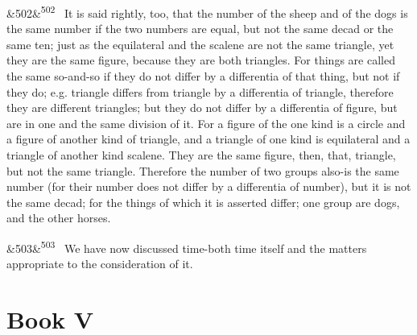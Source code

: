 \documentclass[12pt]{article}
\newcommand{\para}[1][]{\par\noindent\ifx&#1&\else\textsuperscript{\footnotesize #1}~\fi}
\begin{document}
\para[502] It is said rightly, too, that the number of the sheep and of the dogs is the same number if the two numbers are equal, but not the same decad or the same ten; just as the equilateral and the scalene are not the same triangle, yet they are the same figure, because they are both triangles. For things are called the same so-and-so if they do not differ by a differentia of that thing, but not if they do; e.g. triangle differs from triangle by a differentia of triangle, therefore they are different triangles; but they do not differ by a differentia of figure, but are in one and the same division of it. For a figure of the one kind is a circle and a figure of another kind of triangle, and a triangle of one kind is equilateral and a triangle of another kind scalene. They are the same figure, then, that, triangle, but not the same triangle. Therefore the number of two groups also-is the same number (for their number does not differ by a differentia of number), but it is not the same decad; for the things of which it is asserted differ; one group are dogs, and the other horses.

\para[503] We have now discussed time-both time itself and the matters appropriate to the consideration of it.

\section*{Book V}
\end{document}
